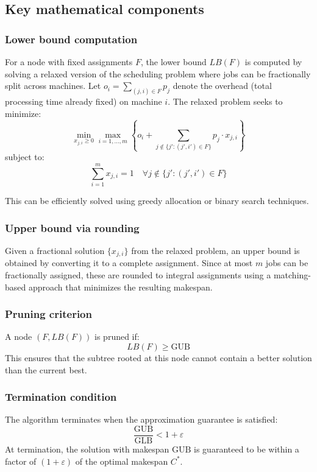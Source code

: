 \subsection{Key mathematical components}

\subsubsection{Lower bound computation}
For a node with fixed assignments $F$, the lower bound $LB(F)$ is computed by solving a relaxed version of the scheduling problem where jobs can be fractionally split across machines.
Let $o_i = \sum_{(j,i) \in F} p_j$ denote the overhead (total processing time already fixed) on machine $i$.
The relaxed problem seeks to minimize:
\begin{equation}
\min_{x_{j,i} \geq 0} \max_{i=1,\ldots,m} \left\{ o_i + \sum_{j \notin \{j' : (j',i') \in F\}} p_j \cdot x_{j,i} \right\}
\end{equation}
subject to:
\begin{equation}
\sum_{i=1}^m x_{j,i} = 1 \quad \forall j \notin \{j' : (j',i') \in F\}
\end{equation}

This can be efficiently solved using greedy allocation or binary search techniques.

\subsubsection{Upper bound via rounding}
Given a fractional solution $\{x_{j,i}\}$ from the relaxed problem, an upper bound is obtained by converting it to a complete assignment.
Since at most $m$ jobs can be fractionally assigned, these are rounded to integral assignments using a matching-based approach that minimizes the resulting makespan.

\subsubsection{Pruning criterion}
A node $(F, LB(F))$ is pruned if:
\begin{equation}
LB(F) \geq \text{GUB}
\end{equation}
This ensures that the subtree rooted at this node cannot contain a better solution than the current best.

\subsubsection{Termination condition}
The algorithm terminates when the approximation guarantee is satisfied:
\begin{equation}
\frac{\text{GUB}}{\text{GLB}} < 1 + \varepsilon
\end{equation}
At termination, the solution with makespan $\text{GUB}$ is guaranteed to be within a factor of $(1+\varepsilon)$ of the optimal makespan $C^*$.